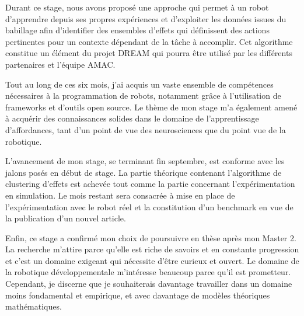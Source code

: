 \documentclass{llncs}
\begin{document}
Durant ce stage, nous avons proposé une approche qui permet à un robot d'apprendre depuis ses propres expériences et d'exploiter les données issues du babillage afin d'identifier des ensembles d'effets qui définissent des actions pertinentes pour un contexte dépendant de la tâche à accomplir.
Cet algorithme constitue un élément du projet DREAM qui pourra être utilisé par les différents partenaires et l'équipe AMAC.

Tout au long de ces six mois, j'ai acquis un vaste ensemble de compétences nécessaires à la programmation de robots, notamment grâce à l'utilisation de frameworks et d'outils open source.
Le thème de mon stage m'a également amené à acquérir des connaissances solides dans le domaine de l'apprentissage d'affordances, tant d'un point de vue des neurosciences que du point vue de la robotique.

L'avancement de mon stage, se terminant fin septembre, est conforme avec les jalons posés en début de stage.
La partie théorique contenant l'algorithme de clustering d'effets est achevée tout comme la partie concernant l'expérimentation en simulation.
Le mois restant sera consacrée à mise en place de l'expérimentation avec le robot réel et la constitution d'un benchmark en vue de la publication d'un nouvel article.

Enfin, ce stage a confirmé mon choix de poursuivre en thèse après mon Master 2.
La recherche m'attire parce qu'elle est riche de savoirs et en constante progression et c'est un domaine exigeant qui nécessite d'être curieux et ouvert.
Le domaine de la robotique développementale m'intéresse beaucoup parce qu'il est prometteur.
Cependant, je discerne que je souhaiterais davantage travailler dans un domaine moins fondamental et empirique, et avec davantage de modèles théoriques mathématiques.




\end{document}

